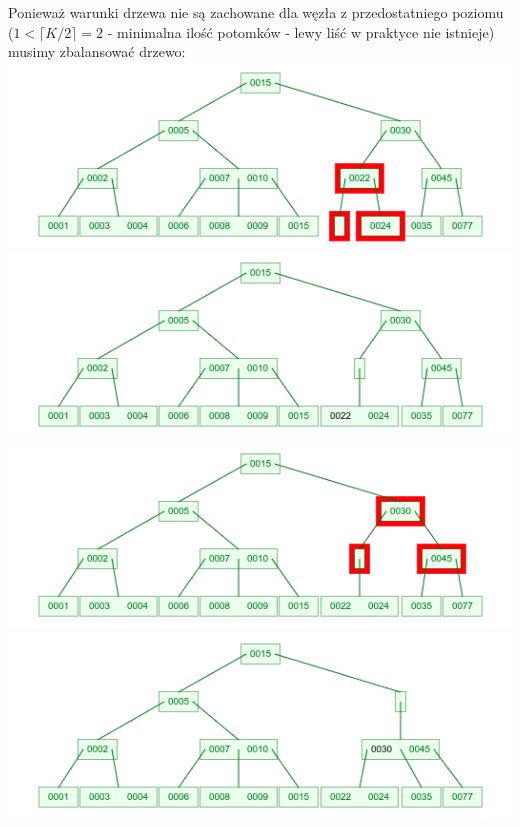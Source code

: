 \documentclass[12pt]{article}
\begin{document}
	\noindent Ponieważ warunki drzewa nie są zachowane dla węzła z przedostatniego poziomu ($1 < \lceil K/2 \rceil = 2$ - minimalna ilość potomków - lewy liść w praktyce nie istnieje) musimy zbalansować drzewo: \\
	\includegraphics[width=\linewidth]{graphics/b-trees/delete/rebalance-02.png} \\
	\includegraphics[width=\linewidth]{graphics/b-trees/delete/rebalance-03.png} \\
	\includegraphics[width=\linewidth]{graphics/b-trees/delete/rebalance-04.png} \\
	\includegraphics[width=\linewidth]{graphics/b-trees/delete/rebalance-05.png} \\
\end{document}
